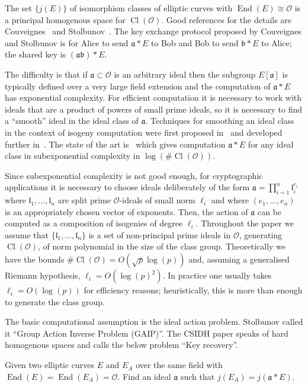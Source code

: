 \documentclass{llncs}
\newcommand{\OO}{\mathcal{O}}
\DeclareMathOperator{\End}{End}
\DeclareMathOperator{\Cl}{Cl}
\renewcommand{\a}{\mathfrak{a}}
\renewcommand{\b}{\mathfrak{b}}
\renewcommand{\l}{\mathfrak{l}}
\begin{document}
The set $\{ j(E) \}$ of isomorphism classes of elliptic curves with $\End(E) \cong \OO$ is a principal homogenous space for $\Cl(\OO )$.
Good references for the details are Couveignes~\cite{Couv06} and Stolbunov~\cite{Sto12}.
The key exchange protocol proposed by Couveignes and Stolbunov is for Alice to send $\a * E$ to Bob and Bob to send $\b * E$ to Alice; the shared key is $(\a\b) * E$.


The difficulty is that if $\a\subset\OO$ is an arbitrary ideal then the subgroup $E[ \a ]$ is typically defined over a very large field extension and the computation of $\a*E$ has exponential complexity.
For efficient computation it is necessary to work with ideals that are a product of powers of small prime ideals, so it is necessary to find a ``smooth'' ideal in the ideal class of $\a$.
Techniques for smoothing an ideal class in the context of isogeny computation were first proposed in~\cite{GHS02} and developed further in~\cite{BCL08,JS10,biasse_fieker_jacobson_2016}.
The state of the art is~\cite{biasse_fieker_jacobson_2016} which gives computation $\a * E$ for any ideal class in subexponential complexity in $\log(\#\Cl(\OO))$.

Since subexponential complexity is not good enough, for cryptographic applications it is necessary to choose ideals deliberately of the form $\a = \prod_{i=1}^n \l_i^{e_i}$ where $\l_1, \dots, \l_n$ are split prime $\OO$-ideals of small norm $\ell_i$ and where $(e_1, \dots, e_n)$ is an appropriately chosen vector of exponents.
Then, the action of $\a$ can be computed as a composition of isogenies of degree $\ell_i$.
Throughout the paper we assume that $\{ \l_1, \dots, \l_n \}$ is a set of non-principal prime ideals in $\OO$, generating $\Cl(\OO)$, of norm polynomial in the size of the class group.
Theoretically we have the bounds $\#\Cl(\OO) = O( \sqrt{p} \log(p) )$ and, assuming a generalised Riemann hypothesis, $\ell_i = O( \log(p)^2 )$.
In practice one usually takes $\ell_i=O(\log(p))$ for efficiency reasons; heuristically, this is more than enough to generate the class group.

The basic computational assumption is the ideal action problem.
Stolbunov called it ``Group Action Inverse Problem (GAIP)''.
The CSIDH paper speaks of hard homogenous spaces and calls the below problem ``Key recovery''.

\begin{problem}\label{defn:ass1}
Given two elliptic curves $E$ and $E_A$ over the same field with $\End(E) = \End(E_A) = \OO$. Find an ideal $\a$ such that $j( E_A ) = j( \a * E )$.
\end{problem}
\end{document}
